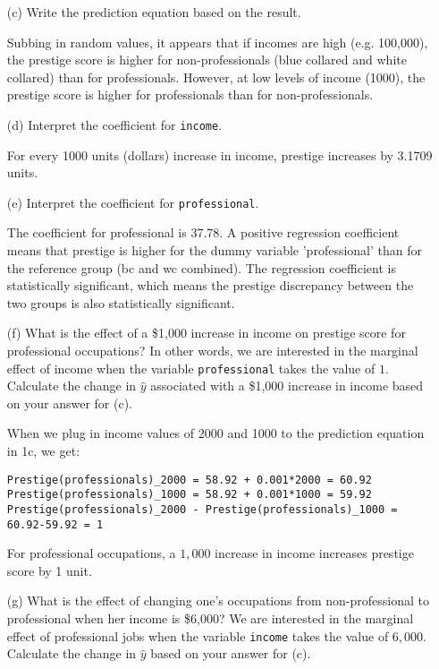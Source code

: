 \documentclass[12pt,letterpaper]{article}
\begin{document}
\begin{enumerate}
	\item [(c)]
	Write the prediction equation based on the result.
\vspace{.5cm}
  
\vspace{.5cm}   
\noindent Subbing in random values, it appears that if incomes are high (e.g. 100,000), the prestige score is higher for non-professionals (blue collared and white collared) than for professionals. However, at low levels of income (1000), the prestige score is higher for professionals than for non-professionals.
	
\newpage
	\item [(d)]
	Interpret the coefficient for \texttt{income}.

\noindent For every 1000 units (dollars) increase in income, prestige increases by 3.1709 units.
	
	\vspace{0.5cm}	
	\item [(e)]
	Interpret the coefficient for \texttt{professional}.

\noindent The coefficient for professional is 37.78. A positive regression coefficient means that prestige is higher for the dummy variable 'professional' than for the reference group (bc and wc combined). The regression coefficient is statistically significant, which means the prestige discrepancy between the two groups is also statistically significant.
	
	\item [(f)]
	What is the effect of a \$1,000 increase in income on prestige score for professional occupations? In other words, we are interested in the marginal effect of income when the variable \texttt{professional} takes the value of $1$. Calculate the change in $\hat{y}$ associated with a \$1,000 increase in income based on your answer for (c).
	
	\vspace{0.6cm}
\noindent When we plug in income values of 2000 and 1000 to the prediction equation in 1c, we get:
\begin{verbatim}
Prestige(professionals)_2000 = 58.92 + 0.001*2000 = 60.92
Prestige(professionals)_1000 = 58.92 + 0.001*1000 = 59.92
Prestige(professionals)_2000 - Prestige(professionals)_1000 = 60.92-59.92 = 1
\end{verbatim}
\noindent For professional occupations, a $1,000$ increase in income increases prestige score by 1 unit.
	
	\item [(g)]
	What is the effect of changing one's occupations from non-professional to professional when her income is \$6,000? We are interested in the marginal effect of professional jobs when the variable \texttt{income} takes the value of $6,000$. Calculate the change in $\hat{y}$ based on your answer for (c).


\end{enumerate}
\end{document}
